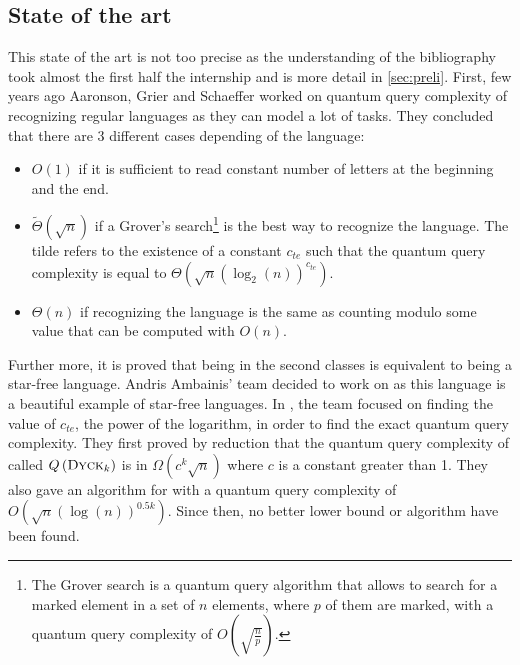 \subsection{State of the art}
This state of the art is not too precise as the understanding of the
bibliography took almost the first half the internship and is
more detail in \autoref{sec:preli}. First, few years ago Aaronson,
Grier and Schaeffer \cite[2019]{trichotomy_not_andris} worked on quantum query complexity
of recognizing regular languages as they can model a lot of tasks. They
concluded that there are 3 different cases depending of the language:
\begin{itemize}
    \item $O(1)$ if it is sufficient to read constant number of letters at the beginning and the end.
    \item $\tilde{\Theta}(\sqrt{n})$ if a Grover's search\footnote{
              The Grover search is a quantum query algorithm that allows to
              search for a marked element in a set of $n$ elements, where $p$ of them are marked,
              with a quantum query complexity of $O(\sqrt{\frac{n}{p}})$.
          } is the best way to recognize the language. The tilde refers to the existence of a
          constant $c_{te}$ such that the quantum query complexity is
          equal to $\Theta \left(\sqrt{n}(\log_2(n))^{c_{te}}\right)$.
    \item $\Theta(n)$ if recognizing the language is the same as counting modulo some value that can
          be computed with $O(n)$.
\end{itemize}
Further more, it is proved that being in the second classes is equivalent to
being a star-free language. Andris Ambainis' team decided to work on  as this
language is a beautiful example of star-free languages. In \cite[2020]{art:2DGrid},
the team focused on finding the value of $c_{te}$, the power of the logarithm, in order
to find the exact quantum query complexity.
They first proved by reduction that the quantum query complexity of 
called $Q\left(\textsc{Dyck$_{k}$}\right)$ is in $\Omega\left(c^k\sqrt{n}\right)$ where $c$ is
a constant greater than 1. They also gave an algorithm for  with a quantum
query complexity of $O\left(\sqrt{n}(\log(n))^{0.5k}\right)$. Since then, no better
lower bound or algorithm have been found.

